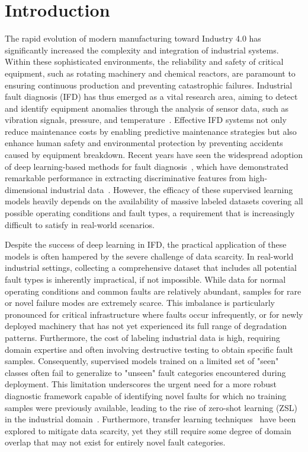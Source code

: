 \section{Introduction}
\label{sec:intro}

The rapid evolution of modern manufacturing toward Industry 4.0 has significantly increased the complexity and integration of industrial systems. Within these sophisticated environments, the reliability and safety of critical equipment, such as rotating machinery and chemical reactors, are paramount to ensuring continuous production and preventing catastrophic failures. Industrial fault diagnosis (IFD) has thus emerged as a vital research area, aiming to detect and identify equipment anomalies through the analysis of sensor data, such as vibration signals, pressure, and temperature~\cite{lei2020applications}. Effective IFD systems not only reduce maintenance costs by enabling predictive maintenance strategies but also enhance human safety and environmental protection by preventing accidents caused by equipment breakdown. Recent years have seen the widespread adoption of deep learning-based methods for fault diagnosis~\cite{lecun2015deep,zhao2019deep}, which have demonstrated remarkable performance in extracting discriminative features from high-dimensional industrial data~\cite{jing2017hierarchical}. However, the efficacy of these supervised learning models heavily depends on the availability of massive labeled datasets covering all possible operating conditions and fault types, a requirement that is increasingly difficult to satisfy in real-world scenarios.

Despite the success of deep learning in IFD, the practical application of these models is often hampered by the severe challenge of data scarcity. In real-world industrial settings, collecting a comprehensive dataset that includes all potential fault types is inherently impractical, if not impossible. While data for normal operating conditions and common faults are relatively abundant, samples for rare or novel failure modes are extremely scarce. This imbalance is particularly pronounced for critical infrastructure where faults occur infrequently, or for newly deployed machinery that has not yet experienced its full range of degradation patterns. Furthermore, the cost of labeling industrial data is high, requiring domain expertise and often involving destructive testing to obtain specific fault samples. Consequently, supervised models trained on a limited set of "seen" classes often fail to generalize to "unseen" fault categories encountered during deployment. This limitation underscores the urgent need for a more robust diagnostic framework capable of identifying novel faults for which no training samples were previously available, leading to the rise of zero-shot learning (ZSL) in the industrial domain~\cite{xian2019zero}. Furthermore, transfer learning techniques~\cite{zhang2017deep} have been explored to mitigate data scarcity, yet they still require some degree of domain overlap that may not exist for entirely novel fault categories.

